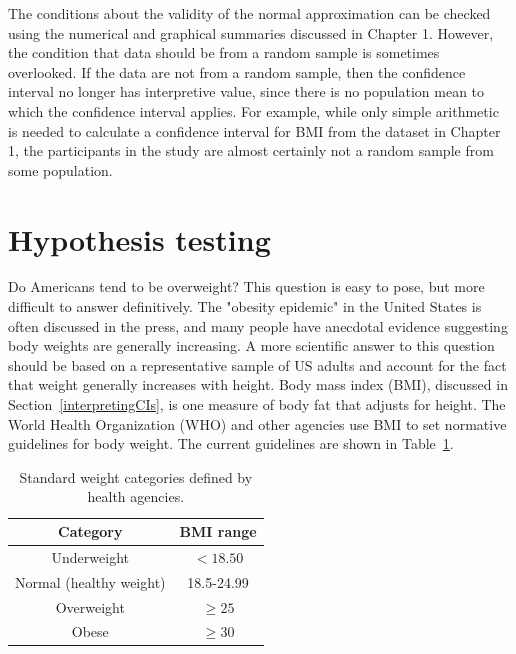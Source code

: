 \begin{spacing}{1.5}
The conditions about the validity of the normal approximation can be checked using the numerical and graphical summaries discussed in Chapter 1. However, the condition that data should be from a random sample is sometimes overlooked. If the data are not from a random sample, then the confidence interval no longer has interpretive value, since there is no population mean to which the confidence interval applies. For example, while only simple arithmetic is needed to calculate a confidence interval for BMI from the  dataset in Chapter 1, the participants in the study are almost certainly not a random sample from some population. 





\section[Hypothesis testing]{Hypothesis testing} %
\label{hypothesisTesting}


Do Americans tend to be overweight? This question is easy to pose, but more difficult to answer definitively. The "obesity epidemic" in the United States is often discussed in the press, and many people have anecdotal evidence suggesting body weights are generally increasing. A more scientific answer to this question should be based on a representative sample of US adults and account for the fact that weight generally increases with height. Body mass index (BMI), discussed in Section~\ref{interpretingCIs}, is one measure of body fat that adjusts for height. The World Health Organization (WHO) and other agencies use BMI to set normative guidelines for body weight. The current guidelines are shown in Table~\ref{whoBmiGuidelines}. 


\begin{table}[h!]
\begin{center}
\begin{tabular}{|c|c|}
\hline 
Category & BMI range\tabularnewline
\hline 
\hline 
Underweight & $<18.50$\tabularnewline
\hline 
Normal (healthy weight) & 18.5-24.99\tabularnewline
\hline 
Overweight & $\geq 25$\tabularnewline
\hline 
Obese & $\geq30$\tabularnewline
\hline
\end{tabular}
\caption{Standard weight categories defined by health agencies.} 
\label{whoBmiGuidelines}
\end{center}
\end{table}


\end{spacing}
